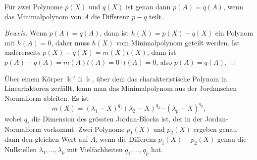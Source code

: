 \begin{satz}
Für zwei Polynome $p(X)$ und $q(X)$ ist genau dann $p(A)=q(A)$, wenn
das Minimalpolynom von $A$ die Differenz $p-q$ teilt.
\end{satz}

\begin{proof}[Beweis]
Wenn $p(A)=q(A)$, dann ist $h(X)=p(X)-q(X)$ ein Polynom mit $h(A)=0$,
daher muss $h(X)$ vom Minimalpolynom geteilt werden.
Ist andererseits $p(X)-q(X)=m(X)t(X)$, dann ist
$p(A)-q(A)=m(A)t(A)=0\cdot t(A) = 0$, also $p(A)=q(A)$.
\end{proof}

Über einem Körper $\Bbbk'\supset\Bbbk$, über dem das charakteristische
Polynom in Linearfaktoren zerfällt, kann man das Minimalpolynom aus
der Jordanschen Normalform ableiten.
Es ist
\[
m(X)
=
(\lambda_1-X)^{q_1}
(\lambda_2-X)^{q_2}
\cdots
(\lambda_p-X)^{q_p},
\]
wobei $q_i$ die Dimension des grössten Jordan-Blocks ist, der in der
Jordan-Normalform vorkommt.
Zwei Polynome $p_1(X)$ und $p_2(X)$ ergeben genau dann den gleichen Wert
auf $A$,
wenn die Differenz $p_1(X)-p_2(X)$ genau die Nullstellen
$\lambda_1,\dots,\lambda_p$ mit Vielfachheiten $q_1,\dots,q_p$ hat.

